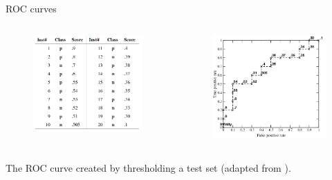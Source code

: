 \documentclass{beamer}
\begin{document}
\begin{frame}{ROC curves}
 \begin{columns}
  \begin{column}{0.5\textwidth}
    \begin{figure}
    \includegraphics[width=0.8\linewidth]{tableROC}
    \end{figure}
  \end{column}
  \begin{column}{0.5\textwidth}
    \begin{figure}
    \includegraphics[width=0.8\linewidth]{ROCcurve}
    \end{figure}
  \end{column}
 \end{columns}
 The ROC curve created by thresholding a test set (adapted from \cite{fawcettIntroductionROCAnalysis2006}).
\end{frame}
\end{document}
